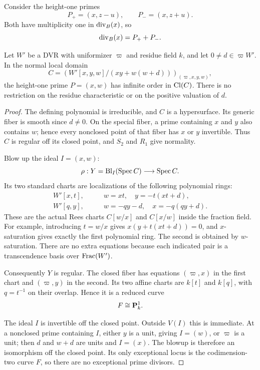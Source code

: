 Consider the height-one primes
\[
P_+=(x,z-u),\qquad P_-=(x,z+u).
\]
Both have multiplicity one in $\operatorname{div}_B(x)$, so
\begin{equation}\label{d3:eq:divx}
\operatorname{div}_B(x)=P_++P_-.
\end{equation}

\begin{lemma}\label{d3:lem:smallresolution}
Let $W'$ be a DVR with uniformizer $\varpi$ and residue field $k$, and let $0\neq d\in\varpi W'$. In the normal local domain
\[
C=\left(W'[x,y,w]/(xy+w(w+d))\right)_{(\varpi,x,y,w)},
\]
the height-one prime $P=(x,w)$ has infinite order in $\operatorname{Cl}(C)$. There is no restriction on the residue characteristic or on the positive valuation of $d$.
\end{lemma}
\begin{proof}
The defining polynomial is irreducible, and $C$ is a hypersurface. Its generic fiber is smooth since $d\neq0$. On the special fiber, a prime containing $x$ and $y$ also contains $w$; hence every nonclosed point of that fiber has $x$ or $y$ invertible. Thus $C$ is regular off its closed point, and $S_2$ and $R_1$ give normality.

Blow up the ideal $I=(x,w)$:
\[
\rho:Y=\operatorname{Bl}_{I}(\operatorname{Spec} C)\longrightarrow\operatorname{Spec} C.
\]
Its two standard charts are localizations of the following polynomial rings:
\begin{align*}
W'[x,t],&\qquad w=xt,\quad y=-t(xt+d),\\
W'[q,y],&\qquad w=-qy-d,\quad x=-q(qy+d).
\end{align*}
These are the actual Rees charts $C[w/x]$ and $C[x/w]$ inside the fraction field. For example, introducing $t=w/x$ gives $x(y+t(xt+d))=0$, and $x$-saturation gives exactly the first polynomial ring. The second is obtained by $w$-saturation. There are no extra equations because each indicated pair is a transcendence basis over $\operatorname{Frac}(W')$.

Consequently $Y$ is regular. The closed fiber has equations $(\varpi,x)$ in the first chart and $(\varpi,y)$ in the second. Its two affine charts are $k[t]$ and $k[q]$, with $q=t^{-1}$ on their overlap. Hence it is a reduced curve
\[
F\cong\mathbf P^1_k.
\]

The ideal $I$ is invertible off the closed point. Outside $V(I)$ this is immediate. At a nonclosed prime containing $I$, either $y$ is a unit, giving $I=(w)$, or $\varpi$ is a unit; then $d$ and $w+d$ are units and $I=(x)$. The blowup is therefore an isomorphism off the closed point. Its only exceptional locus is the codimension-two curve $F$, so there are no exceptional prime divisors.


\end{proof}
